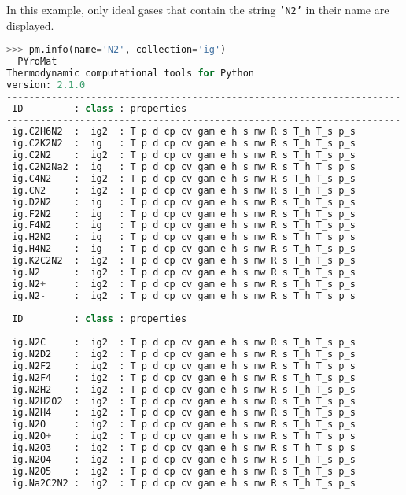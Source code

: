 In this example, only ideal gases that contain the string \texttt{'N2'} in their name are displayed.
\begin{lstlisting}[language=Python,style=tinystyle]
>>> pm.info(name='N2', collection='ig')
  PYroMat
Thermodynamic computational tools for Python
version: 2.1.0
----------------------------------------------------------------------
 ID         : class : properties
----------------------------------------------------------------------
 ig.C2H6N2  :  ig2  : T p d cp cv gam e h s mw R s T_h T_s p_s        
 ig.C2K2N2  :  ig   : T p d cp cv gam e h s mw R s T_h T_s p_s        
 ig.C2N2    :  ig2  : T p d cp cv gam e h s mw R s T_h T_s p_s        
 ig.C2N2Na2 :  ig   : T p d cp cv gam e h s mw R s T_h T_s p_s        
 ig.C4N2    :  ig2  : T p d cp cv gam e h s mw R s T_h T_s p_s        
 ig.CN2     :  ig2  : T p d cp cv gam e h s mw R s T_h T_s p_s        
 ig.D2N2    :  ig   : T p d cp cv gam e h s mw R s T_h T_s p_s        
 ig.F2N2    :  ig   : T p d cp cv gam e h s mw R s T_h T_s p_s        
 ig.F4N2    :  ig   : T p d cp cv gam e h s mw R s T_h T_s p_s        
 ig.H2N2    :  ig   : T p d cp cv gam e h s mw R s T_h T_s p_s        
 ig.H4N2    :  ig   : T p d cp cv gam e h s mw R s T_h T_s p_s        
 ig.K2C2N2  :  ig2  : T p d cp cv gam e h s mw R s T_h T_s p_s        
 ig.N2      :  ig2  : T p d cp cv gam e h s mw R s T_h T_s p_s        
 ig.N2+     :  ig2  : T p d cp cv gam e h s mw R s T_h T_s p_s        
 ig.N2-     :  ig2  : T p d cp cv gam e h s mw R s T_h T_s p_s        
----------------------------------------------------------------------
 ID         : class : properties
----------------------------------------------------------------------
 ig.N2C     :  ig2  : T p d cp cv gam e h s mw R s T_h T_s p_s        
 ig.N2D2    :  ig2  : T p d cp cv gam e h s mw R s T_h T_s p_s        
 ig.N2F2    :  ig2  : T p d cp cv gam e h s mw R s T_h T_s p_s        
 ig.N2F4    :  ig2  : T p d cp cv gam e h s mw R s T_h T_s p_s        
 ig.N2H2    :  ig2  : T p d cp cv gam e h s mw R s T_h T_s p_s        
 ig.N2H2O2  :  ig2  : T p d cp cv gam e h s mw R s T_h T_s p_s        
 ig.N2H4    :  ig2  : T p d cp cv gam e h s mw R s T_h T_s p_s        
 ig.N2O     :  ig2  : T p d cp cv gam e h s mw R s T_h T_s p_s        
 ig.N2O+    :  ig2  : T p d cp cv gam e h s mw R s T_h T_s p_s        
 ig.N2O3    :  ig2  : T p d cp cv gam e h s mw R s T_h T_s p_s        
 ig.N2O4    :  ig2  : T p d cp cv gam e h s mw R s T_h T_s p_s        
 ig.N2O5    :  ig2  : T p d cp cv gam e h s mw R s T_h T_s p_s        
 ig.Na2C2N2 :  ig2  : T p d cp cv gam e h s mw R s T_h T_s p_s   
\end{lstlisting}

